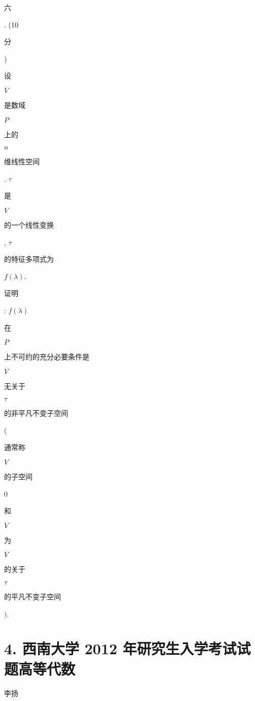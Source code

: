 \documentclass[10pt]{article}
\begin{document}
\begin{CJK}{UTF8}{mj}六\end{CJK}. (10 \begin{CJK}{UTF8}{mj}分\end{CJK}) \begin{CJK}{UTF8}{mj}设\end{CJK} $V$ \begin{CJK}{UTF8}{mj}是数域\end{CJK} $P$ \begin{CJK}{UTF8}{mj}上的\end{CJK} $n$ \begin{CJK}{UTF8}{mj}维线性空间\end{CJK}, $\tau$ \begin{CJK}{UTF8}{mj}是\end{CJK} $V$ \begin{CJK}{UTF8}{mj}的一个线性变换\end{CJK}, $\tau$ \begin{CJK}{UTF8}{mj}的特征多项式为\end{CJK} $f(\lambda)$. \begin{CJK}{UTF8}{mj}证明\end{CJK}: $f(\lambda)$ \begin{CJK}{UTF8}{mj}在\end{CJK} $P$ \begin{CJK}{UTF8}{mj}上不可约的充分必要条件是\end{CJK} $V$ \begin{CJK}{UTF8}{mj}无关于\end{CJK} $\tau$ \begin{CJK}{UTF8}{mj}的非平凡不变子空间\end{CJK}(\begin{CJK}{UTF8}{mj}通常称\end{CJK} $V$ \begin{CJK}{UTF8}{mj}的子空间\end{CJK} 0 \begin{CJK}{UTF8}{mj}和\end{CJK} $V$ \begin{CJK}{UTF8}{mj}为\end{CJK} $V$ \begin{CJK}{UTF8}{mj}的关于\end{CJK} $\tau$ \begin{CJK}{UTF8}{mj}的平凡不变子空间\end{CJK} $)$.

\section{4. 西南大学 2012 年研究生入学考试试题高等代数}
\begin{CJK}{UTF8}{mj}李扬\end{CJK}
\end{document}
